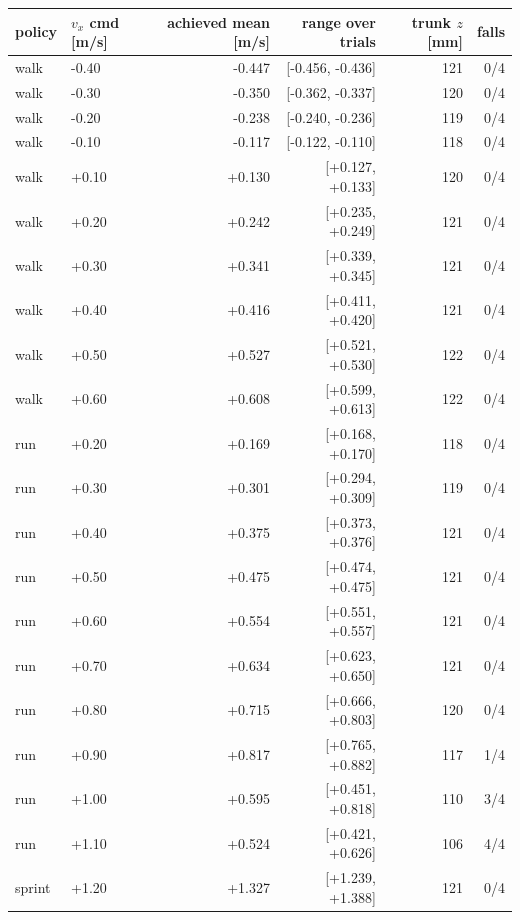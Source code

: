 \begin{tabular}{llrrrr}\toprule
policy & $v_x$ cmd [m/s] & achieved mean [m/s] & range over trials & trunk $z$ [mm] & falls \\\midrule
walk & -0.40 & -0.447 & [-0.456, -0.436] & 121 & 0/4 \\
walk & -0.30 & -0.350 & [-0.362, -0.337] & 120 & 0/4 \\
walk & -0.20 & -0.238 & [-0.240, -0.236] & 119 & 0/4 \\
walk & -0.10 & -0.117 & [-0.122, -0.110] & 118 & 0/4 \\
walk & +0.10 & +0.130 & [+0.127, +0.133] & 120 & 0/4 \\
walk & +0.20 & +0.242 & [+0.235, +0.249] & 121 & 0/4 \\
walk & +0.30 & +0.341 & [+0.339, +0.345] & 121 & 0/4 \\
walk & +0.40 & +0.416 & [+0.411, +0.420] & 121 & 0/4 \\
walk & +0.50 & +0.527 & [+0.521, +0.530] & 122 & 0/4 \\
walk & +0.60 & +0.608 & [+0.599, +0.613] & 122 & 0/4 \\
run & +0.20 & +0.169 & [+0.168, +0.170] & 118 & 0/4 \\
run & +0.30 & +0.301 & [+0.294, +0.309] & 119 & 0/4 \\
run & +0.40 & +0.375 & [+0.373, +0.376] & 121 & 0/4 \\
run & +0.50 & +0.475 & [+0.474, +0.475] & 121 & 0/4 \\
run & +0.60 & +0.554 & [+0.551, +0.557] & 121 & 0/4 \\
run & +0.70 & +0.634 & [+0.623, +0.650] & 121 & 0/4 \\
run & +0.80 & +0.715 & [+0.666, +0.803] & 120 & 0/4 \\
run & +0.90 & +0.817 & [+0.765, +0.882] & 117 & 1/4 \\
run & +1.00 & +0.595 & [+0.451, +0.818] & 110 & 3/4 \\
run & +1.10 & +0.524 & [+0.421, +0.626] & 106 & 4/4 \\
sprint & +1.20 & +1.327 & [+1.239, +1.388] & 121 & 0/4 \\
\bottomrule\end{tabular}
